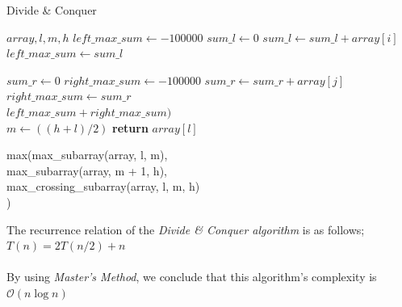 \documentclass[twocolumns]{IEEEtran}
\begin{document}
\begin{algorithm}
	\caption{Divide \& Conquer}
	\begin{algorithmic}[1]
		
	 {$array, l, m, h$}
	\State$left\_max\_sum \leftarrow -100000$
	\State$sum\_l \leftarrow 0$
		\State$sum\_l \leftarrow sum\_l + array[i]$
			\State $left\_max\_sum \leftarrow sum\_l$
		\EndIf
	\EndFor
	
	\State $sum\_r \leftarrow 0$
	\State $right\_max\_sum \leftarrow -100000$
		\State$sum\_r \leftarrow sum\_r + array[j]$
			\State $right\_max\_sum \leftarrow sum\_r$
		\EndIf
	\EndFor\\
	\Return$left\_max\_sum + right\_max\_sum )$
	\EndFunction
	\\
		\State $m \leftarrow ((h + l) / 2)$
			\State \textbf{return} $array[l]$
		\EndIf
		
		\Return max(max\_subarray(array, l, m),\\
		max\_subarray(array, m + 1, h),\\
		max\_crossing\_subarray(array, l, m, h)\\
		)
	\EndFunction
	\end{algorithmic}
\end{algorithm}
\vspace{2cm}
The recurrence relation of the \textit{Divide \& Conquer algorithm} is as follows; 
$T(n) = 2T(n/2) + n $ \\ \\
By using \textit{Master's Method}, we conclude that this algorithm's complexity is $\mathcal{O}(n\log n)$
\newpage
\end{document}
